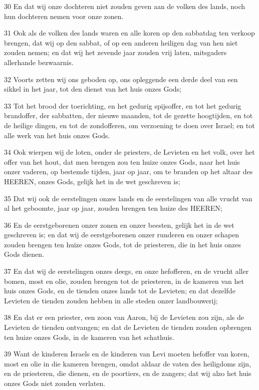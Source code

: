 \par 30 En dat wij onze dochteren niet zouden geven aan de volken des lands, noch hun dochteren nemen voor onze zonen.
\par 31 Ook als de volken des lands waren en alle koren op den sabbatdag ten verkoop brengen, dat wij op den sabbat, of op een anderen heiligen dag van hen niet zouden nemen; en dat wij het zevende jaar zouden vrij laten, mitsgaders allerhande bezwaarnis.
\par 32 Voorts zetten wij ons geboden op, ons opleggende een derde deel van een sikkel in het jaar, tot den dienst van het huis onzes Gods;
\par 33 Tot het brood der toerichting, en het gedurig spijsoffer, en tot het gedurig brandoffer, der sabbatten, der nieuwe maanden, tot de gezette hoogtijden, en tot de heilige dingen, en tot de zondofferen, om verzoening te doen over Israel; en tot alle werk van het huis onzes Gods.
\par 34 Ook wierpen wij de loten, onder de priesters, de Levieten en het volk, over het offer van het hout, dat men brengen zou ten huize onzes Gods, naar het huis onzer vaderen, op bestemde tijden, jaar op jaar, om te branden op het altaar des HEEREN, onzes Gods, gelijk het in de wet geschreven is;
\par 35 Dat wij ook de eerstelingen onzes lands en de eerstelingen van alle vrucht van al het geboomte, jaar op jaar, zouden brengen ten huize des HEEREN;
\par 36 En de eerstgeborenen onzer zonen en onzer beesten, gelijk het in de wet geschreven is; en dat wij de eerstgeborenen onzer runderen en onzer schapen zouden brengen ten huize onzes Gods, tot de priesteren, die in het huis onzes Gods dienen.
\par 37 En dat wij de eerstelingen onzes deegs, en onze hefofferen, en de vrucht aller bomen, most en olie, zouden brengen tot de priesteren, in de kameren van het huis onzes Gods, en de tienden onzes lands tot de Levieten; en dat dezelfde Levieten de tienden zouden hebben in alle steden onzer landbouwerij;
\par 38 En dat er een priester, een zoon van Aaron, bij de Levieten zou zijn, als de Levieten de tienden ontvangen; en dat de Levieten de tienden zouden opbrengen ten huize onzes Gods, in de kameren van het schathuis.
\par 39 Want de kinderen Israels en de kinderen van Levi moeten hefoffer van koren, most en olie in die kameren brengen, omdat aldaar de vaten des heiligdoms zijn, en de priesteren, die dienen, en de poortiers, en de zangers; dat wij alzo het huis onzes Gods niet zouden verlaten.

